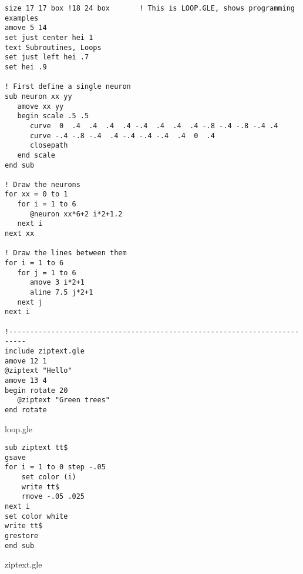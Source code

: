 \clearpage
\begin{center}
\begin{minipage}[t]{12.0cm}
{\scriptsize %
\begin{verbatim}
size 17 17 box !18 24 box		! This is LOOP.GLE, shows programming examples
amove 5 14
set just center hei 1
text Subroutines, Loops
set just left hei .7
set hei .9

! First define a single neuron
sub neuron xx yy
   amove xx yy 
   begin scale .5 .5
      curve  0  .4  .4  .4  .4 -.4  .4  .4  .4 -.8 -.4 -.8 -.4 .4
      curve -.4 -.8 -.4  .4 -.4 -.4 -.4  .4  0  .4   
      closepath
   end scale
end sub

! Draw the neurons
for xx = 0 to 1
   for i = 1 to 6
      @neuron xx*6+2 i*2+1.2
   next i
next xx

! Draw the lines between them
for i = 1 to 6
   for j = 1 to 6
      amove 3 i*2+1
      aline 7.5 j*2+1
   next j
next i

!--------------------------------------------------------------------------
include ziptext.gle
amove 12 1
@ziptext "Hello"
amove 13 4
begin rotate 20
   @ziptext "Green trees"
end rotate
\end{verbatim}
}
\hfill {\small loop.gle}\\
%
{\scriptsize %
\begin{verbatim}
sub ziptext tt$
gsave
for i = 1 to 0 step -.05
	set color (i)
	write tt$ 
	rmove -.05 .025
next i
set color white
write tt$ 
grestore
end sub

\end{verbatim}
}
\hfill {\small ziptext.gle}\\
%
\end{minipage}
\end{center}
\vfill

